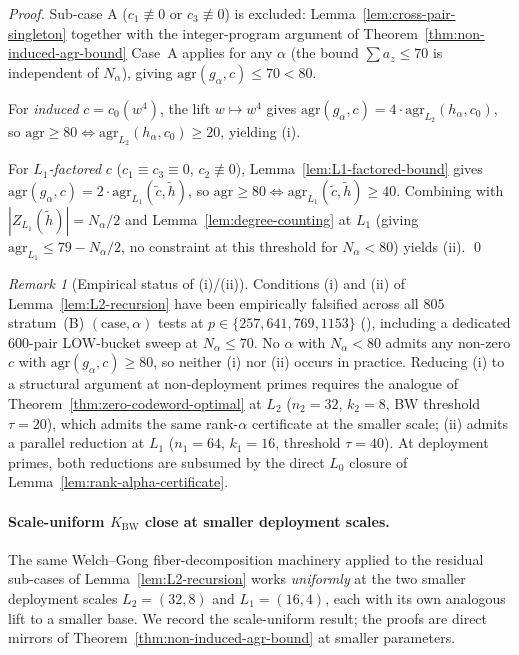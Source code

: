 \documentclass[11pt]{article}
\theoremstyle{definition}
\theoremstyle{remark}
\newtheorem{remark}[theorem]{Remark}
\begin{document}
\begin{proof}
Sub-case A ($c_1 \not\equiv 0$ or $c_3 \not\equiv 0$) is excluded:
Lemma~\ref{lem:cross-pair-singleton} together with the integer-program
argument of Theorem~\ref{thm:non-induced-agr-bound} Case~A applies for
any $\alpha$ (the bound $\sum a_z \leq 70$ is independent of $N_\alpha$),
giving $\mathrm{agr}(g_\alpha, c) \leq 70 < 80$.

For \emph{induced} $c = c_0(w^4)$, the lift $w \mapsto w^4$ gives
$\mathrm{agr}(g_\alpha, c) = 4 \cdot \mathrm{agr}_{L_2}(h_\alpha, c_0)$,
so $\mathrm{agr} \geq 80 \iff \mathrm{agr}_{L_2}(h_\alpha, c_0) \geq 20$,
yielding (i).

For \emph{$L_1$-factored} $c$ ($c_1 \equiv c_3 \equiv 0$,
$c_2 \not\equiv 0$), Lemma~\ref{lem:L1-factored-bound} gives
$\mathrm{agr}(g_\alpha, c) = 2 \cdot \mathrm{agr}_{L_1}(\tilde c, \tilde h)$,
so $\mathrm{agr} \geq 80 \iff \mathrm{agr}_{L_1}(\tilde c, \tilde h) \geq 40$.
Combining with $|Z_{L_1}(\tilde h)| = N_\alpha/2$ and Lemma~\ref{lem:degree-counting} at $L_1$
(giving $\mathrm{agr}_{L_1} \leq 79 - N_\alpha/2$, no constraint at this
threshold for $N_\alpha < 80$) yields (ii).
\qed
\end{proof}

\begin{remark}[Empirical status of (i)/(ii)]
\label{rem:L2-L1-empirical}
Conditions (i) and (ii) of Lemma~\ref{lem:L2-recursion} have been
empirically falsified across all $805$ stratum~(B) $(\text{case}, \alpha)$
tests at $p \in \{257, 641, 769, 1153\}$ (\cite{CompanionRepo}), including a dedicated $600$-pair LOW-bucket sweep at
$N_\alpha \leq 70$. No $\alpha$ with $N_\alpha < 80$ admits any non-zero
$c$ with $\mathrm{agr}(g_\alpha, c) \geq 80$, so neither (i) nor (ii)
occurs in practice. Reducing (i) to a structural argument at non-deployment primes requires
the analogue of Theorem~\ref{thm:zero-codeword-optimal} at $L_2$
($n_2 = 32$, $k_2 = 8$, BW threshold $\tau = 20$), which admits the
same rank-$\alpha$ certificate at the smaller scale; (ii) admits a
parallel reduction at $L_1$ ($n_1 = 64$, $k_1 = 16$, threshold
$\tau = 40$). At deployment primes, both reductions are subsumed by
the direct $L_0$ closure of Lemma~\ref{lem:rank-alpha-certificate}.
\end{remark}

\paragraph{Scale-uniform $K_{\mathrm{BW}}$ close at smaller deployment scales.}
The same Welch--Gong fiber-decomposition machinery applied to the residual
sub-cases of Lemma~\ref{lem:L2-recursion} works \emph{uniformly} at the
two smaller deployment scales $L_2 = (32, 8)$ and $L_1 = (16, 4)$, each
with its own analogous lift to a smaller base. We record the scale-uniform
result; the proofs are direct mirrors of
Theorem~\ref{thm:non-induced-agr-bound} at smaller parameters.
\end{document}
